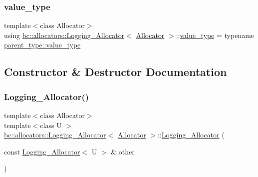 \mbox{\label{structbc_1_1allocators_1_1Logging__Allocator_af0f639779c1d0d646bca2c077c34d7d3}} 
\subsubsection{\texorpdfstring{value\+\_\+type}{value\_type}}
{\footnotesize\ttfamily template$<$class Allocator$>$ \\
using \hyperlink{structbc_1_1allocators_1_1Logging__Allocator}{bc\+::allocators\+::\+Logging\+\_\+\+Allocator}$<$ \hyperlink{classbc_1_1allocators_1_1Allocator}{Allocator} $>$\+::\hyperlink{structbc_1_1allocators_1_1Allocator__Forwarder_a3ac0b07579279c948a24ee6562510dc5}{value\+\_\+type} =  typename \hyperlink{structbc_1_1allocators_1_1Allocator__Forwarder_a3ac0b07579279c948a24ee6562510dc5}{parent\+\_\+type\+::value\+\_\+type}}



\subsection{Constructor \& Destructor Documentation}
\mbox{\label{structbc_1_1allocators_1_1Logging__Allocator_a8ac5909883585f7187d60b21cdd870c6}} 
\subsubsection{\texorpdfstring{Logging\+\_\+\+Allocator()}{Logging\_Allocator()}\hspace{0.1cm}{\footnotesize\ttfamily [1/4]}}
{\footnotesize\ttfamily template$<$class Allocator$>$ \\
template$<$class U $>$ \\
\hyperlink{structbc_1_1allocators_1_1Logging__Allocator}{bc\+::allocators\+::\+Logging\+\_\+\+Allocator}$<$ \hyperlink{classbc_1_1allocators_1_1Allocator}{Allocator} $>$\+::\hyperlink{structbc_1_1allocators_1_1Logging__Allocator}{Logging\+\_\+\+Allocator} (\begin{DoxyParamCaption}\item[{const \hyperlink{structbc_1_1allocators_1_1Logging__Allocator}{Logging\+\_\+\+Allocator}$<$ U $>$ \&}]{other }\end{DoxyParamCaption})\hspace{0.3cm}{\ttfamily [inline]}}

